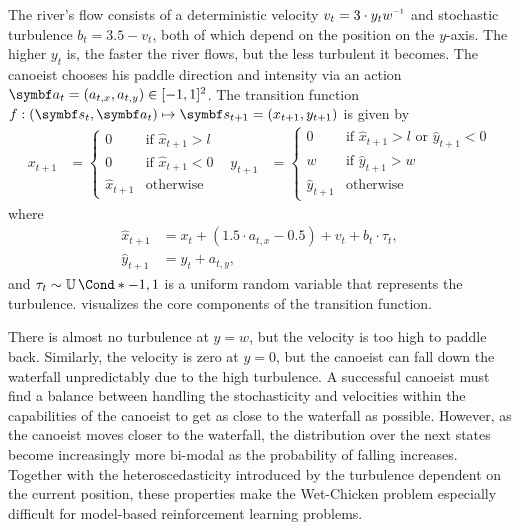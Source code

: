 The river's flow consists of a deterministic velocity $v_t = 3 \cdot y_t w\inv$ and stochastic turbulence $b_t = 3.5 - v_t$, both of which depend on the position on the $y$-axis.
The higher $y_t$ is, the faster the river flows, but the less turbulent it becomes.
The canoeist chooses his paddle direction and intensity via an action $\mat{a}_t = (a_{t,x}, a_{t,y}) \in [-1, 1]^2$.
The transition function $f : (\mat{s}_t, \mat{a}_t) \mapsto \mat{s}_{t+1} = (x_{t+1}, y_{t+1})$ is given by
\begin{align}
    x_{t+1} & = \begin{cases}
        0             & \text{if } \hat{x}_{t+1} > l \\
        0             & \text{if } \hat{x}_{t+1} < 0 \\
        \hat{x}_{t+1} & \text{otherwise}
    \end{cases} &
    y_{t+1} & = \begin{cases}
        0             & \text{if } \hat{x}_{t+1} > l \text{ or } \hat{y}_{t+1} < 0 \\
        w             & \text{if } \hat{y}_{t+1} > w                               \\
        \hat{y}_{t+1} & \text{otherwise}
    \end{cases}
\end{align}
where
\begin{equation}
    \begin{split}
        \hat{x}_{t+1} &= x_t + (1.5 \cdot a_{t, x} - 0.5)  + v_t + b_t \cdot \tau_t, \\
        \hat{y}_{t+1} &= y_t + a_{t, y},
    \end{split}
\end{equation}
and $\tau_t \sim \Fun*{\Uni}{-1, 1}$ is a uniform random variable that represents the turbulence.
 visualizes the core components of the transition function.

There is almost no turbulence at $y = w$, but the velocity is too high to paddle back.
Similarly, the velocity is zero at $y = 0$, but the canoeist can fall down the waterfall unpredictably due to the high turbulence.
A successful canoeist must find a balance between handling the stochasticity and velocities within the capabilities of the canoeist to get as close to the waterfall as possible.
However, as the canoeist moves closer to the waterfall, the distribution over the next states become increasingly more bi-modal as the probability of falling increases.
Together with the heteroscedasticity introduced by the turbulence dependent on the current position, these properties make the Wet-Chicken problem especially difficult for model-based reinforcement learning problems.


